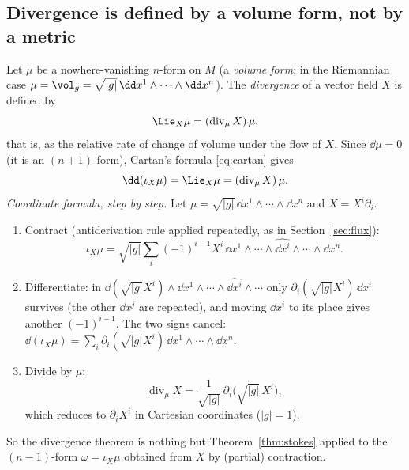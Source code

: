 \subsection{Divergence is defined by a volume form, not by a metric}\label{sec:divmu}

Let $\mu$ be a nowhere-vanishing $n$-form on $M$ (a \emph{volume form}; in the Riemannian case $\mu=\vol_g=\sqrt{|g|}\,\dd x^1\wedge\cdots\wedge\dd x^n$). The \emph{divergence} of a vector field $X$ is defined by
\begin{equation}\label{eq:Lmu}
\Lie_X\mu=(\operatorname{div}_\mu X)\,\mu,
\end{equation}
that is, as the relative rate of change of volume under the flow of $X$. Since $\dd\mu=0$ (it is an $(n+1)$-form), Cartan's formula \eqref{eq:cartan} gives
\begin{equation}\label{eq:divmu}
\dd(\iota_X\mu)=\Lie_X\mu=(\operatorname{div}_\mu X)\,\mu .
\end{equation}
\emph{Coordinate formula, step by step.} Let $\mu=\sqrt{|g|}\,\dd x^1\wedge\cdots\wedge\dd x^n$ and $X=X^i\partial_i$.
\begin{enumerate}
\item Contract (antiderivation rule applied repeatedly, as in Section~\ref{sec:flux}): \[\iota_X\mu=\sqrt{|g|}\sum_i(-1)^{i-1}X^i\,\dd x^1\wedge\cdots\wedge\widehat{\dd x^i}\wedge\cdots\wedge\dd x^n.\]
\item Differentiate: in $\dd(\sqrt{|g|}X^i)\wedge\dd x^1\wedge\cdots\wedge\widehat{\dd x^i}\wedge\cdots$ only $\partial_i(\sqrt{|g|}X^i)\,\dd x^i$ survives (the other $\dd x^j$ are repeated), and moving $\dd x^i$ to its place gives another $(-1)^{i-1}$. The two signs cancel: $\dd(\iota_X\mu)=\sum_i\partial_i(\sqrt{|g|}X^i)\,\dd x^1\wedge\cdots\wedge\dd x^n$.
\item Divide by $\mu$:
\begin{equation}\label{eq:divcoord}
\operatorname{div}_\mu X=\frac1{\sqrt{|g|}}\,\partial_i\bigl(\sqrt{|g|}\,X^i\bigr),
\end{equation}
which reduces to $\partial_iX^i$ in Cartesian coordinates ($|g|=1$).
\end{enumerate}
So the divergence theorem is nothing but Theorem~\ref{thm:stokes} applied to the $(n-1)$-form $\omega=\iota_X\mu$ obtained from $X$ by (partial) contraction.
